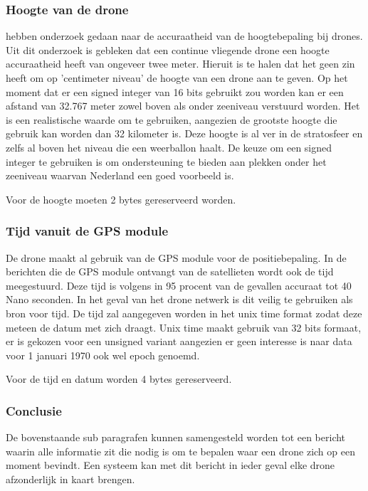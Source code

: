 \documentclass[a4paper, 11pt, oneside]{report}
\begin{document}
\subsubsection*{Hoogte van de drone}
 hebben onderzoek gedaan naar de accuraatheid van de hoogtebepaling bij drones. 
Uit dit onderzoek is gebleken dat een continue vliegende drone een hoogte accuraatheid heeft van ongeveer twee meter.
Hieruit is te halen dat het geen zin heeft om op 'centimeter niveau' de hoogte van een drone aan te geven.
Op het moment dat er een signed integer van 16 bits gebruikt zou worden kan er een afstand van 32.767 meter zowel boven als onder zeeniveau verstuurd worden.
Het is een realistische waarde om te gebruiken, aangezien de grootste hoogte die gebruik kan worden dan 32 kilometer is.
Deze hoogte is al ver in de stratosfeer en zelfs al boven het niveau die een weerballon haalt. 
De keuze om een signed integer te gebruiken is om ondersteuning te bieden aan plekken onder het zeeniveau waarvan Nederland een goed voorbeeld is.

Voor de hoogte moeten 2 bytes gereserveerd worden. 

\subsubsection*{Tijd vanuit de GPS module}

De drone maakt al gebruik van de GPS module voor de positiebepaling.
In de berichten die de GPS module ontvangt van de satellieten wordt ook de tijd meegestuurd.
Deze tijd is volgens \cite{GPSaccu} in 95 procent van de gevallen accuraat tot 40 Nano seconden. 
In het geval van het drone netwerk is dit veilig te gebruiken als bron voor tijd.
De tijd zal aangegeven worden in het unix time format zodat deze meteen de datum met zich draagt.
Unix time maakt gebruik van 32 bits formaat, er is gekozen voor een unsigned variant aangezien er geen interesse is naar data voor 1 januari 1970 ook wel epoch genoemd.

Voor de tijd en datum worden 4 bytes gereserveerd.

\subsubsection*{Conclusie}  

De bovenstaande sub paragrafen kunnen samengesteld worden tot een bericht waarin alle informatie zit die nodig is om te bepalen waar een drone zich op een moment bevindt.
Een systeem kan met dit bericht in ieder geval elke drone afzonderlijk in kaart brengen.
\end{document}
